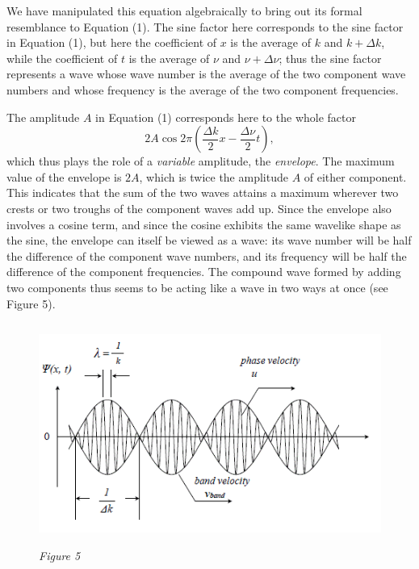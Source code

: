 We have manipulated this equation algebraically to bring out its formal
resemblance to Equation (1). The sine factor here corresponds to the sine
factor in Equation (1), but here the coefficient of $x$ is the
average of $k$ and $k + \Delta k$, while the coefficient of
$t$ is the average of $\nu$ and $\nu + \Delta\nu$; thus the
sine factor represents a wave whose wave number is the average of the
two component wave numbers and whose frequency is the average of the two
component frequencies.

The amplitude $A$ in Equation (1) corresponds here to the whole
factor 
%
\begin{equation*}
2A\cos 2\pi\left(\frac{\Delta k}{2}x - \frac{\Delta\nu}{2}t\right) , 
\end{equation*}
%
which thus plays the role of a \emph{variable} amplitude, the
\emph{envelope}. The maximum value of the envelope is $2A$, which
is twice the amplitude $A$ of either component. This indicates that
the sum of the two waves attains a maximum wherever two crests or two
troughs of the component waves add up. Since the envelope also involves
a cosine term, and since the cosine exhibits the same wavelike shape as
the sine, the envelope can itself be viewed as a wave: its wave number
will be half the difference of the component wave numbers, and its
frequency will be half the difference of the component frequencies. The
compound wave formed by adding two components thus seems to be acting
like a wave in two ways at once (see Figure 5).

\begin{figure}[h] %
  \begin{center}
    \includegraphics[width=4.90625in,height=2.85417in]{images/08_debroglie/image036.png}
    \caption*{\emph{Figure 5}}
  \end{center}
\end{figure}

